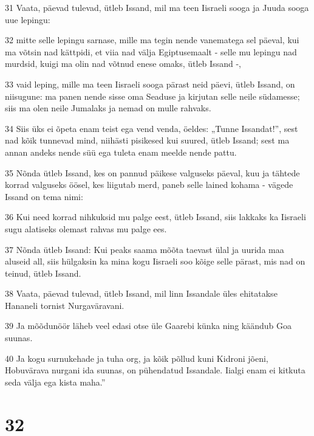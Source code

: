 \par 31 Vaata, päevad tulevad, ütleb Issand, mil ma teen Iisraeli sooga ja Juuda sooga uue lepingu:
\par 32 mitte selle lepingu sarnase, mille ma tegin nende vanematega sel päeval, kui ma võtsin nad kättpidi, et viia nad välja Egiptusemaalt - selle mu lepingu nad murdsid, kuigi ma olin nad võtnud enese omaks, ütleb Issand -,
\par 33 vaid leping, mille ma teen Iisraeli sooga pärast neid päevi, ütleb Issand, on niisugune: ma panen nende sisse oma Seaduse ja kirjutan selle neile südamesse; siis ma olen neile Jumalaks ja nemad on mulle rahvaks.
\par 34 Siis üks ei õpeta enam teist ega vend venda, öeldes: „Tunne Issandat!”, sest nad kõik tunnevad mind, niihästi pisikesed kui suured, ütleb Issand; sest ma annan andeks nende süü ega tuleta enam meelde nende pattu.
\par 35 Nõnda ütleb Issand, kes on pannud päikese valguseks päeval, kuu ja tähtede korrad valguseks öösel, kes liigutab merd, paneb selle lained kohama - vägede Issand on tema nimi:
\par 36 Kui need korrad nihkuksid mu palge eest, ütleb Issand, siis lakkaks ka Iisraeli sugu alatiseks olemast rahvas mu palge ees.
\par 37 Nõnda ütleb Issand: Kui peaks saama mõõta taevast ülal ja uurida maa aluseid all, siis hülgaksin ka mina kogu Iisraeli soo kõige selle pärast, mis nad on teinud, ütleb Issand.
\par 38 Vaata, päevad tulevad, ütleb Issand, mil linn Issandale üles ehitatakse Hananeli tornist Nurgaväravani.
\par 39 Ja mõõdunöör läheb veel edasi otse üle Gaarebi künka ning käändub Goa suunas.
\par 40 Ja kogu surnukehade ja tuha org, ja kõik põllud kuni Kidroni jõeni, Hobuvärava nurgani ida suunas, on pühendatud Issandale. Iialgi enam ei kitkuta seda välja ega kista maha.”

\chapter{32}

